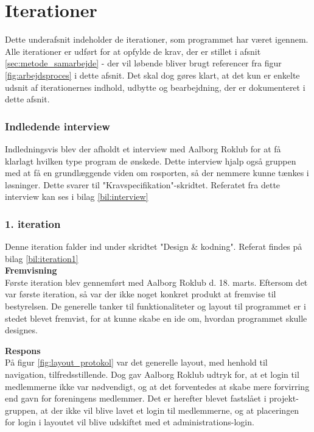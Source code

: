 
\section{Iterationer}
\label{sec:imple_iterationer}
Dette underafsnit indeholder de iterationer, som programmet har været igennem. Alle iterationer er udført for at opfylde de krav, der er stillet i afsnit \ref{sec:metode_samarbejde} - der vil løbende bliver brugt referencer fra figur \ref{fig:arbejdsproces} i dette afsnit. Det skal dog gøres klart, at det kun er enkelte udsnit af iterationernes indhold, udbytte og bearbejdning, der er dokumenteret i dette afsnit.

\subsubsection{Indledende interview}
Indledningsvis blev der afholdt et interview med Aalborg Roklub for at få klarlagt hvilken type program de ønskede. Dette interview hjalp også gruppen med at få en grundlæggende viden om rosporten, så der nemmere kunne tænkes i løsninger. Dette svarer til "Kravspecifikation"\mbox{}-skridtet. Referatet fra dette interview kan ses i bilag \ref{bil:interview}

\subsubsection{1. iteration}
Denne iteration falder ind under skridtet "Design \& kodning". Referat findes på bilag \ref{bil:iteration1}\\

{\bf Fremvisning}\\
Første iteration blev gennemført med Aalborg Roklub d. 18. marts. Eftersom det var første iteration, så var der ikke noget konkret produkt at fremvise til bestyrelsen. De generelle tanker til funktionaliteter og layout til programmet er i stedet blevet fremvist, for at kunne skabe en ide om, hvordan programmet skulle designes.


{\bf Respons}\\
På figur \ref{fig:layout_protokol} var det generelle layout, med henhold til navigation, tilfredsstillende. Dog gav Aalborg Roklub udtryk for, at et login til medlemmerne ikke var nødvendigt, og at det forventedes at skabe mere forvirring end gavn for foreningens medlemmer. Det er herefter blevet fastslået i projekt-gruppen, at der ikke vil blive lavet et login til medlemmerne, og at placeringen for login i layoutet vil blive udskiftet med et administrations-login.


